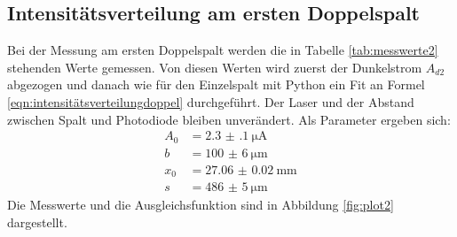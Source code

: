 \documentclass[
  bibliography=totoc,     %
  captions=tableheading,  %
  titlepage=firstiscover, %
]{scrartcl}
\begin{document}
\subsection{Intensitätsverteilung am ersten Doppelspalt}
Bei der Messung am ersten Doppelspalt werden die in Tabelle \ref{tab:messwerte2}
stehenden Werte gemessen. Von diesen Werten wird zuerst der Dunkelstrom
$A_{d2}$ abgezogen und danach wie für den Einzelspalt mit Python ein Fit
an Formel \eqref{eqn:intensitätsverteilungdoppel} durchgeführt. Der Laser
und der Abstand zwischen Spalt und Photodiode bleiben unverändert. Als
Parameter ergeben sich:
\begin{align*}
  A_0 &= \SI{2.3(1)}{\micro\ampere}\\
  b &= \SI{100(6)}{\micro\meter}\\
  x_0 &= \SI{27.06(2)}{\milli\meter}\\
  s &= \SI{486(5)}{\micro\meter}
\end{align*}
Die Messwerte und die Ausgleichsfunktion sind in Abbildung \ref{fig:plot2}
dargestellt.
\end{document}
